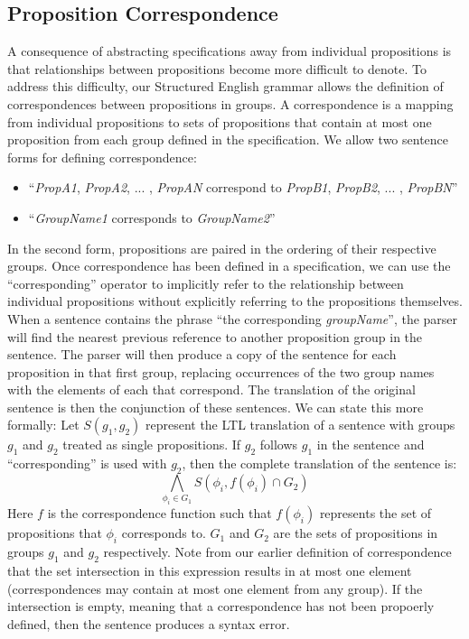 \subsection{Proposition Correspondence} 
A consequence of abstracting specifications away from individual propositions is that relationships between propositions become more difficult to denote. To address this difficulty, our Structured English grammar allows the definition of correspondences between propositions in groups. A correspondence is a mapping from individual propositions to sets of propositions that contain at most one proposition from each group defined in the specification. We allow two sentence forms for defining correspondence: 
\begin{itemize}
	\item ``\textit{PropA1}, \textit{PropA2}, ... , \textit{PropAN} correspond to \textit{PropB1}, \textit{PropB2}, ... , \textit{PropBN}''
	\item ``\textit{GroupName1} corresponds to \textit{GroupName2}''
\end{itemize} 
In the second form, propositions are paired in the ordering of their respective groups. Once correspondence has been defined in a specification, we can use the ``corresponding'' operator to implicitly refer to the relationship between individual propositions without explicitly referring to the propositions themselves. When a sentence contains the phrase ``the corresponding \textit{groupName}'', the parser will find the nearest previous reference to another proposition group in the sentence. The parser will then produce a copy of the sentence for each proposition in that first group, replacing occurrences of the two group names with the elements of each that correspond. The translation of the original sentence is then the conjunction of these sentences. We can state this more formally: Let $S(g_1,g_2)$ represent the LTL translation of a sentence with groups $g_1$ and $g_2$ treated as single propositions. If $g_2$ follows $g_1$ in the sentence and ``corresponding'' is used with $g_2$, then the complete translation of the sentence is:
\begin{equation*}
	\bigwedge \limits_{\phi_i \in G_1} S(\phi_i, f(\phi_i) \cap G_2)
\end{equation*}
Here $f$ is the correspondence function such that $f(\phi_i)$ represents the set of propositions that $\phi_i$ corresponds to. $G_1$ and $G_2$ are the sets of propositions in groups $g_1$ and $g_2$ respectively. Note from our earlier definition of correspondence that the set intersection in this expression results in at most one element (correspondences may contain at most one element from any group). If the intersection is empty, meaning that a correspondence has not been propoerly defined, then the sentence produces a syntax error. 

